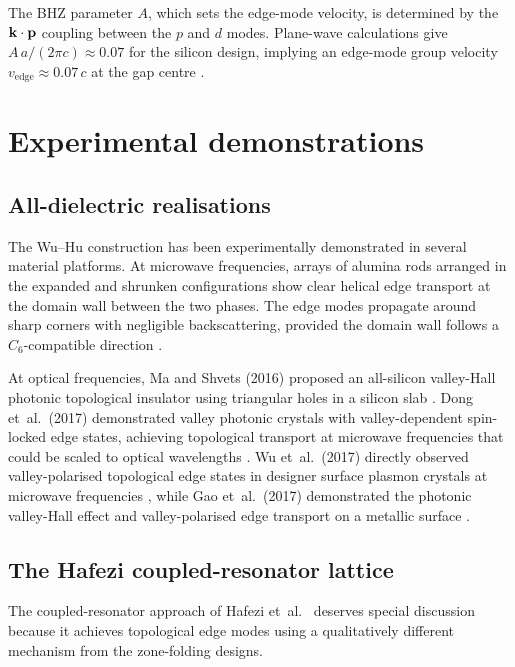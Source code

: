The BHZ parameter $A$, which sets the edge-mode velocity, is determined
by the $\mathbf{k}\cdot\mathbf{p}$ coupling between the $p$ and $d$ modes.
Plane-wave calculations give $A\,a/(2\pi c)\approx 0.07$ for the
silicon design, implying an edge-mode group velocity
$v_{\mathrm{edge}}\approx 0.07\,c$ at the gap centre
\cite{ozawa2018topological}.

\section{Experimental demonstrations}
\label{sec:ch11-experiments}

\subsection{All-dielectric realisations}
\label{sec:ch11-all-dielectric}

The Wu--Hu construction has been experimentally demonstrated in
several material platforms.  At microwave frequencies, arrays of
alumina rods arranged in the expanded and shrunken configurations
show clear helical edge transport at the domain wall between the
two phases.  The edge modes propagate around sharp corners with
negligible backscattering, provided the domain wall follows a
$C_6$-compatible direction \cite{ozawa2018topological}.

At optical frequencies, Ma and Shvets (2016) proposed an all-silicon
valley-Hall photonic topological insulator using triangular holes in
a silicon slab \cite{ma2016all}.  Dong et~al.\ (2017) demonstrated
valley photonic crystals with valley-dependent spin-locked edge
states, achieving topological transport at microwave frequencies that
could be scaled to optical wavelengths \cite{dong2016valley}.
Wu et~al.\ (2017) directly observed valley-polarised topological edge
states in designer surface plasmon crystals at microwave frequencies
\cite{wu2017direct}, while Gao et~al.\ (2017) demonstrated the
photonic valley-Hall effect and valley-polarised edge transport on a
metallic surface \cite{gao2017valley}.

\subsection{The Hafezi coupled-resonator lattice}
\label{sec:ch11-hafezi-detail}

The coupled-resonator approach of Hafezi et~al.\
\cite{hafezi2013imaging} deserves special discussion because it
achieves topological edge modes using a qualitatively different
mechanism from the zone-folding designs.

